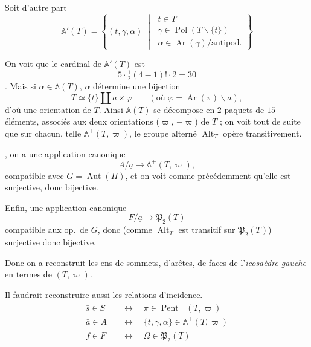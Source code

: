 \documentclass[11pt,a4paper]{article}
\begin{document}
Soit d'autre part
\[
  \mathbb{A}'(T) = \left\{ (t, \gamma, \alpha) \;\middle|\;
  \begin{array}{l}
    t \in T \\
    \gamma \in \operatorname{Pol}(T \smallsetminus \{t\}) \\
    \alpha \in \operatorname{Ar}(\gamma)/\text{antipod.}
  \end{array}
  \right\}
\]

On voit que le cardinal de $\mathbb{A}'(T)$ est
\[
  5 \cdot \tfrac12 (4 - 1)! \cdot 2 = 30
\]
\struck{\ill{}}. Mais si $\alpha \in \mathbb{A}(T)$, $\alpha$ détermine une
bijection
\[
  T \simeq \{t\} \amalg a \times \varphi
  \qquad (\text{où } \varphi = \operatorname{Ar}(\pi) \smallsetminus a),
\]
d'où une orientation de $T$. Ainsi $\mathbb{A}(T)$ se décompose en $2$
paquets de $15$ éléments, associés aux deux orientations ($\varpi$,
$-\varpi$) de $T$ ; on voit tout de suite que sur chacun, telle
$\mathbb{A}^{+}(T, \varpi)$, le groupe alterné $\operatorname{Alt}_T$
opère transitivement.

, on a une application canonique
\[
  A/\underline{a} \longrightarrow \mathbb{A}^{+}(T, \varpi) ,
\]
compatible avec $G = \operatorname{Aut}(\Pi)$, et on voit comme
précédemment qu'elle est surjective, donc bijective.

Enfin,  une application canonique
\[
  F/\underline{a} \longrightarrow \mathfrak{P}_2(T)
\]
compatible aux op.\ de $G$, donc (comme $\operatorname{Alt}_T$ est
transitif sur $\mathfrak{P}_2(T)$) surjective donc bijective.


Donc on a reconstruit les ens de sommets, d'arêtes, de faces de
l'\emph{icosaèdre gauche} en termes de $(T, \varpi)$.

Il faudrait reconstruire aussi les relations d'incidence.
\begin{align*}
  \bar{s} \in \bar{S} \quad &\longleftrightarrow \quad \pi \in
    \operatorname{Pent}^{+}(T, \varpi) \\
  \bar{a} \in \bar{A} \quad &\longleftrightarrow \quad \{t, \gamma, \alpha\}
    \in \mathbb{A}^{+}(T, \varpi) \\
  \bar{f} \in \bar{F} \quad &\longleftrightarrow \quad \Omega \in
    \mathfrak{P}_2(T)
\end{align*}
\end{document}
